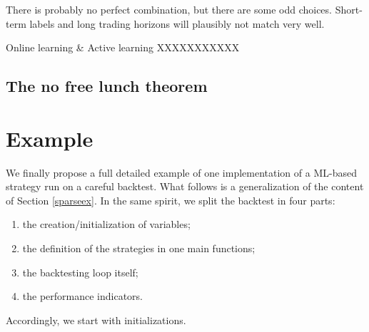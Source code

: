 \documentclass[]{krantz}
\providecommand{\tightlist}{%
  \setlength{\itemsep}{0pt}\setlength{\parskip}{0pt}}
\theoremstyle{definition}
\theoremstyle{definition}
\theoremstyle{definition}
\theoremstyle{remark}
\begin{document}
There is probably no perfect combination, but there are some odd
choices. Short-term labels and long trading horizons will plausibly not
match very well.

Online learning \& Active learning XXXXXXXXXXX \citet{settles2009active}

\hypertarget{the-no-free-lunch-theorem}{%
\subsection{The no free lunch theorem}\label{the-no-free-lunch-theorem}}

\hypertarget{example-1}{%
\section{Example}\label{example-1}}

We finally propose a full detailed example of one implementation of a
ML-based strategy run on a careful backtest. What follows is a
generalization of the content of Section \ref{sparseex}. In the same
spirit, we split the backtest in four parts:

\begin{enumerate}
\def\labelenumi{\arabic{enumi}.}
\tightlist
\item
  the creation/initialization of variables;\\
\item
  the definition of the strategies in one main functions;
\item
  the backtesting loop itself;\\
\item
  the performance indicators.
\end{enumerate}

Accordingly, we start with initializations.

\footnotesize
\end{document}
